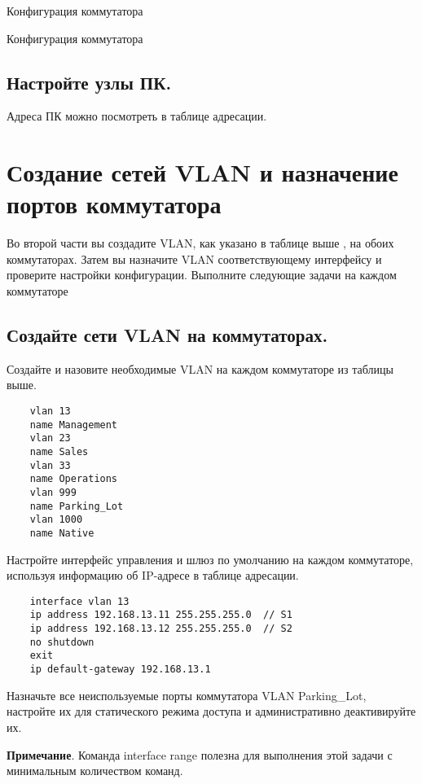 \begin{image}
	\caption{Конфигурация коммутатора}
	\label{fig:switch:set:0}
\end{image}

\begin{image}
	\caption{Конфигурация коммутатора}
	\label{fig:switch:set:1}
\end{image}

\subsection{Настройте узлы ПК.}
Адреса ПК можно посмотреть в таблице адресации.


\section{Создание сетей VLAN и назначение портов коммутатора}
Во второй части вы создадите VLAN, как указано в таблице выше
, на обоих коммутаторах.
Затем вы назначите VLAN соответствующему интерфейсу 
и проверите настройки конфигурации.
Выполните следующие задачи на каждом коммутаторе

\subsection{Создайте сети VLAN на коммутаторах.}
Создайте и назовите необходимые VLAN на каждом коммутаторе из таблицы выше.

\begin{verbatim}
	vlan 13
	name Management
	vlan 23
	name Sales
	vlan 33
	name Operations
	vlan 999
	name Parking_Lot
	vlan 1000
	name Native
\end{verbatim}

Настройте интерфейс управления и шлюз по умолчанию на каждом коммутаторе,
используя информацию об IP-адресе в таблице адресации.

\begin{verbatim}
	interface vlan 13
	ip address 192.168.13.11 255.255.255.0  // S1
	ip address 192.168.13.12 255.255.255.0  // S2
	no shutdown
	exit
	ip default-gateway 192.168.13.1
\end{verbatim}

Назначьте все неиспользуемые порты коммутатора VLAN Parking\_Lot,
настройте их для статического режима доступа
и административно деактивируйте их.\par
\textbf{Примечание}.
Команда interface range полезна для выполнения этой задачи
с минимальным количеством команд.

